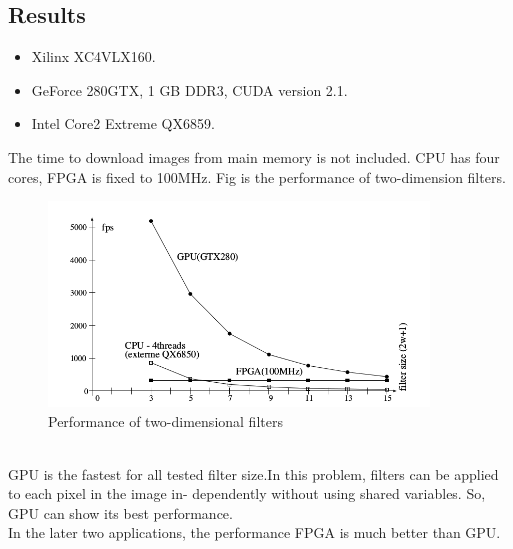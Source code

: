 \subsection{Results}
\begin{itemize}
\item Xilinx XC4VLX160.
\item GeForce 280GTX, 1 GB DDR3, CUDA version 2.1.
\item Intel Core2 Extreme QX6859.
\end{itemize}
The time to download images from main memory is not included. CPU has four cores, FPGA is fixed to 100MHz. Fig is the performance of two-dimension filters.
\begin{figure}[!hbtp]
\centering
\includegraphics[width=0.9\textwidth]{FPGAs/Paper1_1_PerformanceofTwo-DimensionFilters}
\caption{Performance of two-dimensional filters}
\label{fig1.2}
\end{figure}\\
\indent GPU is the fastest for all tested filter size.In this
problem, filters can be applied to each pixel in the image in-
dependently without using shared variables. So, GPU can
show its best performance.\\

{\color{purple} In the later two applications, the performance FPGA is much better than GPU.}
